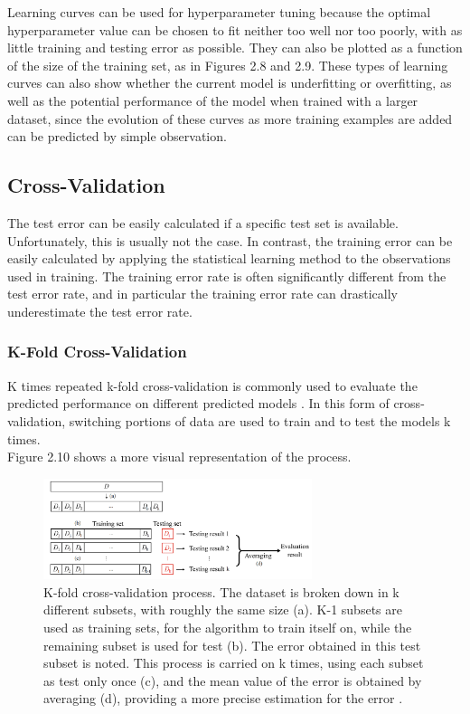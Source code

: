 Learning curves can be used for hyperparameter tuning because the optimal hyperparameter value can be chosen to fit neither too well nor too poorly, with as little training and testing error as possible. They can also be plotted as a function of the size of the training set, as in Figures 2.8 and 2.9. These types of learning curves can also show whether the current model is underfitting or overfitting, as well as the potential performance of the model when trained with a larger dataset, since the evolution of these curves as more training examples are added can be predicted by simple observation.

\subsection{Cross-Validation}
The test error can be easily calculated if a specific 
test set is available. Unfortunately, this is usually not the case. In contrast, the training error can be easily calculated by applying the statistical learning method to the observations used in training. The training error rate is often significantly different from the test error rate, and in particular the training error rate can drastically underestimate the test error rate.
\subsubsection{K-Fold Cross-Validation}
K times repeated k-fold cross-validation is commonly used to evaluate the predicted
performance on different predicted models \cite{YUAN2022100026}. In this form of cross-validation, switching portions of data are used to train and to test the models k times.\\

 Figure 2.10 shows a more visual representation of the process. 
\begin{figure}[h!]
    \centering
    \includegraphics[width=0.7\textwidth]{Images/Methods/CV/Kfcv.png}
    \caption{K-fold cross-validation process. The dataset is broken down in k different subsets, with roughly the same size (a). K-1 subsets are used as training sets, for the algorithm to train itself on, while the remaining subset is used for test (b). The error obtained in this test subset is noted. This process is carried on k times, using each subset as test only once (c), and the mean value of the error is obtained by averaging (d), providing a more precise estimation for the error \cite{Zhou21a}.}
\end{figure}

